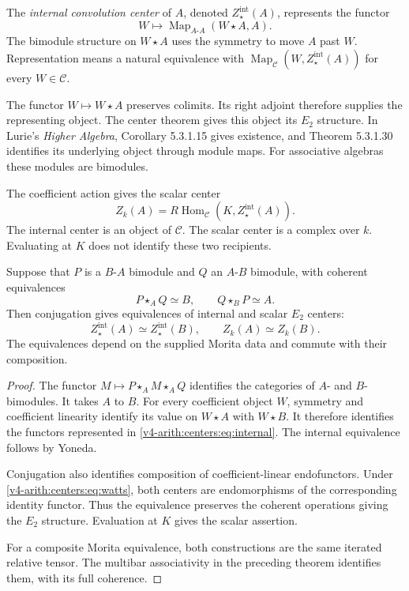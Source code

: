 \begin{definition}\label{v4-arith:centers:def:internal}
The \emph{internal convolution center} of $A$, denoted
$Z^{\mathrm{int}}_\star(A)$, represents the functor
\begin{equation}\label{v4-arith:centers:eq:internal}
 W\longmapsto
 \operatorname{Map}_{A\text{-}A}(W\star A,A).
\end{equation}
The bimodule structure on $W\star A$ uses the symmetry
to move $A$ past $W$. Representation means a natural
equivalence with
$\operatorname{Map}_{\mathcal C}(W,Z^{\mathrm{int}}_\star(A))$
for every $W\in\mathcal C$.
\end{definition}

The functor $W\mapsto W\star A$ preserves colimits.
Its right adjoint therefore supplies the representing
object. The center theorem gives this object its
$E_2$ structure. In Lurie's \emph{Higher Algebra},
Corollary 5.3.1.15 gives existence, and Theorem 5.3.1.30
identifies its underlying object through module maps.
For associative algebras these modules are bimodules.

The coefficient action gives the scalar center
\begin{equation}\label{v4-arith:centers:eq:internal-scalar}
 Z_k(A)=R\operatorname{Hom}_{\mathcal C}
                  (K,Z^{\mathrm{int}}_\star(A)).
\end{equation}
The internal center is an object of $\mathcal C$.
The scalar center is a complex over $k$. Evaluating at
$K$ does not identify these two recipients.

\begin{theorem}
\label{v4-arith:centers:thm:morita}
Suppose that $P$ is a $B$-$A$ bimodule and $Q$ an
$A$-$B$ bimodule, with coherent equivalences
\[
 P\star_AQ\simeq B,\qquad Q\star_BP\simeq A.
\]
Then conjugation gives equivalences of internal and
scalar $E_2$ centers:
\[
 Z^{\mathrm{int}}_\star(A)\simeq
 Z^{\mathrm{int}}_\star(B),\qquad
 Z_k(A)\simeq Z_k(B).
\]
The equivalences depend on the supplied Morita data and
commute with their composition.
\end{theorem}

\begin{proof}
The functor
$M\mapsto P\star_AM\star_AQ$ identifies the categories
of $A$- and $B$-bimodules. It takes $A$ to $B$.
For every coefficient object $W$, symmetry and
coefficient linearity identify its value on $W\star A$
with $W\star B$. It therefore identifies the functors
represented in
\eqref{v4-arith:centers:eq:internal}.
The internal equivalence follows by Yoneda.

Conjugation also identifies composition of
coefficient-linear endofunctors. Under
\eqref{v4-arith:centers:eq:watts}, both centers are
endomorphisms of the corresponding identity functor.
Thus the equivalence preserves the coherent operations
giving the $E_2$ structure. Evaluation at $K$ gives the
scalar assertion.

For a composite Morita equivalence, both constructions
are the same iterated relative tensor. The multibar
associativity in the preceding theorem identifies them,
with its full coherence.
\end{proof}

